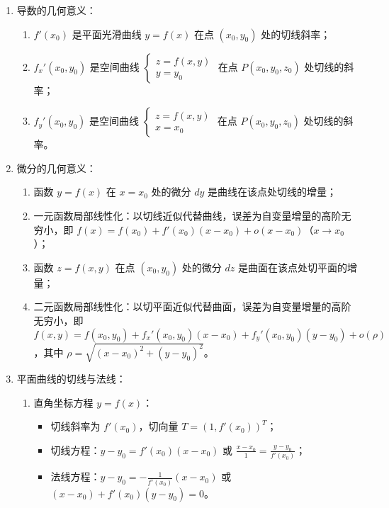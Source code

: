 \documentclass[UTF8]{ctexart}
\theoremstyle{remark}
\begin{document}
	\begin{enumerate}
		\item 导数的几何意义：
		\begin{enumerate}
			\item \(f'(x_0)\) 是平面光滑曲线 \(y = f(x)\) 在点 \((x_0, y_0)\) 处的切线斜率；
			\item \(f_x'(x_0, y_0)\) 是空间曲线 \(\begin{cases} z = f(x, y) \\ y = y_0 \end{cases}\) 在点 \(P(x_0, y_0, z_0)\) 处切线的斜率；
			\item \(f_y'(x_0, y_0)\) 是空间曲线 \(\begin{cases} z = f(x, y) \\ x = x_0 \end{cases}\) 在点 \(P(x_0, y_0, z_0)\) 处切线的斜率。
		\end{enumerate}
		
		\item 微分的几何意义：
		\begin{enumerate}
			\item 函数 \(y = f(x)\) 在 \(x = x_0\) 处的微分 \(dy\) 是曲线在该点处切线的增量；
			\item 一元函数局部线性化：以切线近似代替曲线，误差为自变量增量的高阶无穷小，即 \(f(x) = f(x_0) + f'(x_0)(x - x_0) + o(x - x_0)\)（\(x \to x_0\)）；
			\item 函数 \(z = f(x, y)\) 在点 \((x_0, y_0)\) 处的微分 \(dz\) 是曲面在该点处切平面的增量；
			\item 二元函数局部线性化：以切平面近似代替曲面，误差为自变量增量的高阶无穷小，即 \(f(x, y) = f(x_0, y_0) + f_x'(x_0, y_0)(x - x_0) + f_y'(x_0, y_0)(y - y_0) + o(\rho)\)，其中 \(\rho = \sqrt{(x - x_0)^2 + (y - y_0)^2}\)。
		\end{enumerate}
		
		\item 平面曲线的切线与法线：
		\begin{enumerate}
			\item 直角坐标方程 \(y = f(x)\)：
			\begin{itemize}
				\item 切线斜率为 \(f'(x_0)\)，切向量 \(T = (1, f'(x_0))^T\)；
				\item 切线方程：\(y - y_0 = f'(x_0)(x - x_0)\) 或 \(\frac{x - x_0}{1} = \frac{y - y_0}{f'(x_0)}\)；
				\item 法线方程：\(y - y_0 = -\frac{1}{f'(x_0)}(x - x_0)\) 或 \((x - x_0) + f'(x_0)(y - y_0) = 0\)。
			\end{itemize}
			

\end{enumerate}
\end{enumerate}
\end{document}
